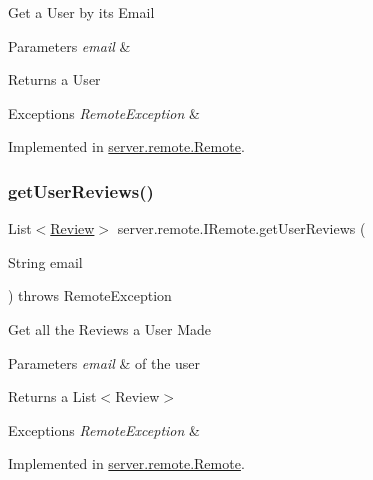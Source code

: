 Get a User by its Email 
\begin{DoxyParams}{Parameters}
{\em email} & \\
\hline
\end{DoxyParams}
\begin{DoxyReturn}{Returns}
a User 
\end{DoxyReturn}

\begin{DoxyExceptions}{Exceptions}
{\em Remote\+Exception} & \\
\hline
\end{DoxyExceptions}


Implemented in \hyperlink{classserver_1_1remote_1_1_remote_abef8350014445d8f2d5ffb4c088e82b6}{server.\+remote.\+Remote}.

\mbox{\label{interfaceserver_1_1remote_1_1_i_remote_a9e52d282ba2386018ebd6817459a743f}} 
\subsubsection{\texorpdfstring{get\+User\+Reviews()}{getUserReviews()}}
{\footnotesize\ttfamily List$<$\hyperlink{classserver_1_1data_1_1_review}{Review}$>$ server.\+remote.\+I\+Remote.\+get\+User\+Reviews (\begin{DoxyParamCaption}\item[{String}]{email }\end{DoxyParamCaption}) throws Remote\+Exception}

Get all the Reviews a User Made 
\begin{DoxyParams}{Parameters}
{\em email} & of the user \\
\hline
\end{DoxyParams}
\begin{DoxyReturn}{Returns}
a List$<$\+Review$>$ 
\end{DoxyReturn}

\begin{DoxyExceptions}{Exceptions}
{\em Remote\+Exception} & \\
\hline
\end{DoxyExceptions}


Implemented in \hyperlink{classserver_1_1remote_1_1_remote_a396c96a6b8802c2b4658ecccd37e84db}{server.\+remote.\+Remote}.

